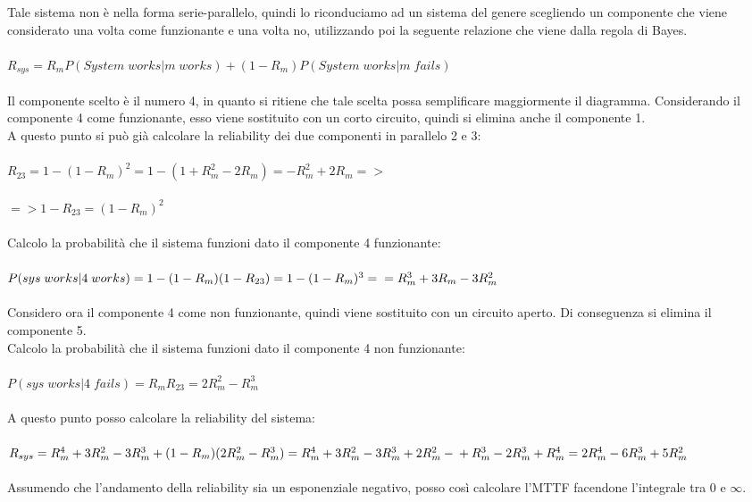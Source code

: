 	Tale sistema non è nella forma serie-parallelo, quindi lo riconduciamo ad un sistema del genere scegliendo un componente che viene considerato una volta come funzionante e una volta no, utilizzando poi la seguente relazione che viene dalla regola di Bayes.\\\\
	$R_{sys}=R_{m}P(System\;works|m\;works)+(1-R_{m})P(System\;works|m\;fails) $\\\\
	Il componente scelto è il numero 4, in quanto si ritiene che tale scelta possa semplificare maggiormente il diagramma. Considerando il componente 4 come funzionante, esso viene sostituito con un corto circuito, quindi si elimina anche il componente 1.\\
	A questo punto si può già calcolare la reliability dei due componenti in parallelo 2 e 3:\\\\
	$ R_{23}=1-(1-R_{m})^{2}=1-(1+R_{m}^{2}-2R_{m})=-R^{2}_{m}+2R_{m}=>$\\\\
	$ => 1-R_{23}=(1-R_{m})^{2} $\\\\
	Calcolo la probabilità che il sistema funzioni dato il componente 4 funzionante:\\\\
	$ P(sys\;works|4\;works)=1-(1-R_{m})(1-R_{23})=1-(1-R_{m})^{3}=\\=R_{m}^{3}+3R_{m}-3R_{m}^{2} $\\\\
	Considero ora il componente 4 come non funzionante, quindi viene sostituito con un circuito aperto. Di conseguenza si elimina il componente 5.\\
	Calcolo la probabilità che il sistema funzioni dato il componente 4 non funzionante:\\\\
	$ P(sys\;works|4\;fails)=R_{m}R_{23}=2R_{m}^{2}-R_{m}^{3} $\\\\
	A questo punto posso calcolare la reliability del sistema:\\\\
	$ R_{sys}=R_{m}^{4}+3R_{m}^{2}-3R_{m}^{3}+(1-R_{m})(2R_{m}^{2}-R_{m}^{3})=R_{m}^{4}+3R_{m}^{2}-3R_{m}^{3}+2R_{m}^{2}-\\+R_{m}^{3}-2R_{m}^{3}+R_{m}^{4}=2R_{m}^{4}-6R_{m}^{3}+5R_{m}^{2} $\\\\
	Assumendo che l'andamento della reliability sia un esponenziale negativo, posso così calcolare l'MTTF facendone l'integrale tra 0 e $\infty$.\\\\
